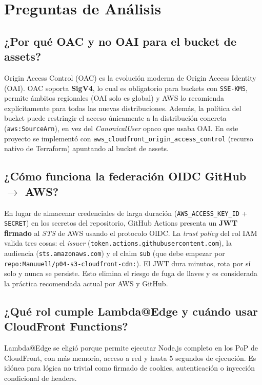 \documentclass[12pt,a4paper]{report}
\begin{document}
\section{Preguntas de Análisis}

\subsection{¿Por qué OAC y no OAI para el bucket de assets?}

Origin Access Control (OAC) es la evolución moderna de Origin Access Identity (OAI). OAC soporta \textbf{SigV4}, lo cual es obligatorio para buckets con \texttt{SSE-KMS}, permite ámbitos regionales (OAI solo es global) y AWS lo recomienda explícitamente para todas las nuevas distribuciones. Además, la política del bucket puede restringir el acceso únicamente a la distribución concreta (\texttt{aws:SourceArn}), en vez del \textit{CanonicalUser} opaco que usaba OAI. En este proyecto se implementó con \texttt{aws\_cloudfront\_origin\_access\_control} (recurso nativo de Terraform) apuntando al bucket de assets.

\subsection{¿Cómo funciona la federación OIDC GitHub $\rightarrow$ AWS?}

En lugar de almacenar credenciales de larga duración (\texttt{AWS\_ACCESS\_KEY\_ID} + \texttt{SECRET}) en los secretos del repositorio, GitHub Actions presenta un \textbf{JWT firmado} al \textit{STS} de AWS usando el protocolo OIDC. La \textit{trust policy} del rol IAM valida tres cosas: el \textit{issuer} (\texttt{token.actions.githubusercontent.com}), la audiencia (\texttt{sts.amazonaws.com}) y el claim \texttt{sub} (que debe empezar por \texttt{repo:Manuuell/p04-s3-cloudfront-cdn:}). El JWT dura minutos, rota por sí solo y nunca se persiste. Esto elimina el riesgo de fuga de llaves y es considerada la práctica recomendada actual por AWS y GitHub.

\subsection{¿Qué rol cumple Lambda@Edge y cuándo usar CloudFront Functions?}

Lambda@Edge se eligió porque permite ejecutar Node.js completo en los PoP de CloudFront, con más memoria, acceso a red y hasta 5 segundos de ejecución. Es idónea para lógica no trivial como firmado de cookies, autenticación o inyección condicional de headers.
\end{document}
